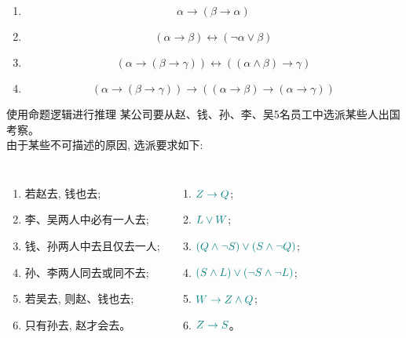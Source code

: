 \begin{frame}{}
  \begin{enumerate}[(1)]
    \item
      \[
        \alpha \to (\beta \to \alpha)
      \]
    \item
      \[
        (\alpha \to \beta) \leftrightarrow (\lnot \alpha \lor \beta)
      \]
    \item
      \[
        (\alpha \to (\beta \to \gamma)) \leftrightarrow ((\alpha \land \beta) \to \gamma)
      \]
    \item
      \[
        (\alpha \to (\beta \to \gamma)) \to ((\alpha \to \beta) \to (\alpha \to \gamma))
      \]
  \end{enumerate}
\end{frame}

\begin{frame}{}
  \begin{exampleblock}{使用命题逻辑进行推理}
    某公司要从赵、钱、孙、李、吴5名员工中选派某些人出国考察。\\
    由于某些不可描述的原因, 选派要求如下:

    \begin{columns}
        \begin{enumerate}[(1)]
          \item 若赵去, 钱也去;
          \item 李、吴两人中必有一人去;
          \item 钱、孙两人中去且仅去一人;
          \item 孙、李两人同去或同不去;
          \item 若吴去, 则赵、钱也去;
          \item 只有孙去, 赵才会去。
        \end{enumerate}
        \begin{enumerate}[(1)]
          \item $\textcolor{teal}{Z \to Q}$;
          \item $\textcolor{teal}{L \lor W}$;
          \item $\textcolor{teal}{(Q \land \lnot S) \lor (S \land \lnot Q)}$;
          \item $\textcolor{teal}{(S \land L) \lor (\lnot S \land \lnot L)}$;
          \item $\textcolor{teal}{W \to Z \land Q}$;
          \item $\textcolor{teal}{Z \to S}$。
        \end{enumerate}
    \end{columns}

    \vspace{0.50cm}
  \end{exampleblock}
\end{frame}

